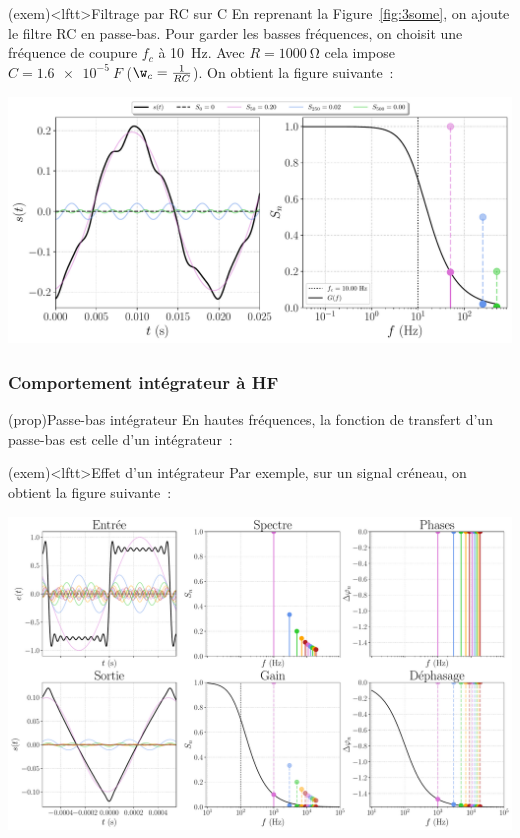 \documentclass[../../main/main.tex]{subfiles}
\begin{document}
\begin{tcb*}[breakable](exem)<lftt>{Filtrage par RC sur C}
	En reprenant la Figure~\ref{fig:3some}, on ajoute le filtre RC en passe-bas.
	Pour garder les basses fréquences, on choisit une fréquence de coupure $f_c$ à
	\SI{10}{Hz}. Avec $R = \SI{1000}{\ohm}$ cela impose $C = \SI{1.6e-5}{F}$
	($\w_c = \frac{1}{RC}$). On obtient la figure suivante~:
	\begin{center}
		\includegraphics[width=.90\linewidth]{fft_50_[1,5,10]_[1,0.5,0.2]_fc=10}
		\vspace{-15pt}
		\label{fig:3some_fltrd}
	\end{center}
	\vspace{-15pt}
\end{tcb*}

\subsubsection{Comportement intégrateur à HF}
\begin{tcb*}(prop){Passe-bas intégrateur}
	En hautes fréquences, la fonction de transfert d'un passe-bas est celle d'un intégrateur~:
\end{tcb*}

\begin{tcb*}(exem)<lftt>{Effet d'un intégrateur}
	Par exemple, sur un signal créneau, on obtient la figure suivante~:
	\begin{center}
		\includegraphics[width=.95\linewidth]{fft_creneau_bth-fe=1000-fc=100}
		\label{fig:creneauPB}
	\end{center}
\end{tcb*}
\end{document}
